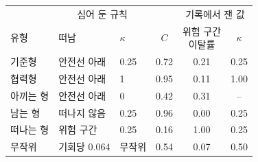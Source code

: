\begin{tabular}{@{}lllccc@{}}
\toprule
 & \multicolumn{2}{c}{심어 둔 규칙} & & \multicolumn{2}{c}{기록에서 잰 값} \\
\cmidrule(lr){2-3}\cmidrule(l){5-6}
유형 & 떠남 & $\kappa$ & $C$ & \shortstack{위험 구간\\이탈률} & $\kappa$ \\
\midrule
기준형 & 안전선 아래 & 0.25 & 0.72 & 0.21 & 0.25 \\
협력형 & 안전선 아래 & 1 & 0.95 & 0.11 & 1.00 \\
아끼는 형 & 안전선 아래 & 0 & 0.42 & 0.31 & -- \\
남는 형 & 떠나지 않음 & 0.25 & 0.96 & 0.00 & 0.25 \\
떠나는 형 & 위험 구간 & 0.25 & 0.16 & 1.00 & 0.25 \\
\addlinespace[2pt]
무작위 & 기회당 0.064 & 무작위 & 0.54 & 0.07 & 0.50 \\
\bottomrule
\end{tabular}
